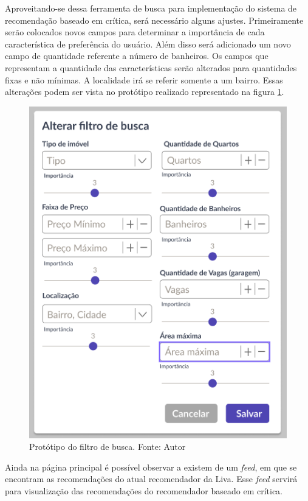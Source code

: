 Aproveitando-se dessa ferramenta de busca para implementação do sistema de recomendação baseado em crítica, será necessário alguns ajustes. Primeiramente serão colocados novos campos para determinar a importância de cada característica de preferência do usuário. Além disso será adicionado um novo campo de quantidade referente a número de banheiros. Os campos que representam a quantidade das características serão alterados para quantidades fixas e não mínimas. A localidade irá se referir somente a um bairro. Essas alterações podem ser vista no protótipo realizado representado na figura \ref{fig:prototipo_search_profile}.

\begin{figure}[H]
    \centering
    \includegraphics[scale=0.6]{figuras/proposta/prototipo_search_profile.png}
    \caption[Protótipo do filtro de busca]{Protótipo do filtro de busca. Fonte: Autor}
    \label{fig:prototipo_search_profile}
\end{figure}

Ainda na página principal é possível observar a existem de um \textit{feed}, em que se encontram as recomendações do atual recomendador da Liva. Esse \textit{feed} servirá para visualização das recomendações do recomendador baseado em crítica.

